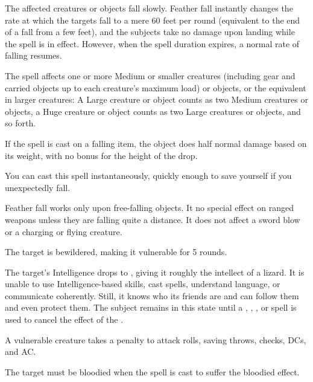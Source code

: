 \spellrng{\rngmed}
\begin{spelleffect}
  The affected creatures or objects fall slowly. Feather fall instantly changes the rate at which the targets fall to a mere 60 feet per round (equivalent to the end of a fall from a few feet), and the subjects take no damage upon landing while the spell is in effect. However, when the spell duration expires, a normal rate of falling resumes.
  \par The spell affects one or more Medium or smaller creatures (including gear and carried objects up to each creature's maximum load) or objects, or the equivalent in larger creatures: A Large creature or object counts as two Medium creatures or objects, a Huge creature or object counts as two Large creatures or objects, and so forth.
  \par If the spell is cast on a falling item, the object does half normal damage based on its weight, with no bonus for the height of the drop.
\end{spelleffect}
\begin{spellnotes}
  You can cast this spell instantaneously, quickly enough to save yourself if you unexpectedly fall. 
  \par Feather fall works only upon free-falling objects. It no special effect on ranged weapons unless they are falling quite a distance. It does not affect a sword blow or a charging or flying creature.
\end{spellnotes}

\spellrng{\rngtouch}
\begin{spellhealthy}
  The target is bewildered, making it vulnerable for 5 rounds.
\end{spellhealthy}
\begin{spellblood}
  The target's Intelligence drops to , giving it roughly the intellect of a lizard. It is unable to use Intelligence-based skills, cast spells, understand language, or communicate coherently. Still, it knows who its friends are and can follow them and even protect them. The subject remains in this state until a , , , or  spell is used to cancel the effect of the .
\end{spellblood}
\begin{spellnotes}
  A vulnerable creature takes a  penalty to attack rolls, saving throws, checks, DCs, and AC.

  The target must be bloodied when the spell is cast to suffer the bloodied effect.
\end{spellnotes}

